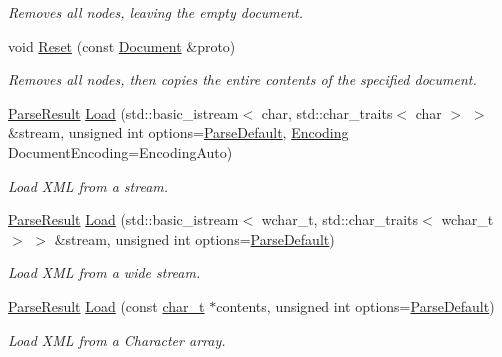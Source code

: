 \begin{DoxyCompactItemize}
\begin{DoxyCompactList}\small\item\em Removes all nodes, leaving the empty document. \item\end{DoxyCompactList}\item 
void \hyperlink{classphys_1_1xml_1_1Document_aba87e21330118fb43b2aab2c36486b03}{Reset} (const \hyperlink{classphys_1_1xml_1_1Document}{Document} \&proto)
\begin{DoxyCompactList}\small\item\em Removes all nodes, then copies the entire contents of the specified document. \item\end{DoxyCompactList}\item 
\hyperlink{structphys_1_1xml_1_1ParseResult}{ParseResult} \hyperlink{classphys_1_1xml_1_1Document_a9d4ddfd3b987fa3d31d41c06d06a001e}{Load} (std::basic\_\-istream$<$ char, std::char\_\-traits$<$ char $>$ $>$ \&stream, unsigned int options=\hyperlink{namespacephys_1_1xml_aa6b8f7f8c2322fd683a235b498834d60}{ParseDefault}, \hyperlink{namespacephys_1_1xml_a420f5de782438f88160321385bea2015}{Encoding} DocumentEncoding=EncodingAuto)
\begin{DoxyCompactList}\small\item\em Load XML from a stream. \item\end{DoxyCompactList}\item 
\hyperlink{structphys_1_1xml_1_1ParseResult}{ParseResult} \hyperlink{classphys_1_1xml_1_1Document_a5c31cda427eeeb61cd40932f7bec6376}{Load} (std::basic\_\-istream$<$ wchar\_\-t, std::char\_\-traits$<$ wchar\_\-t $>$ $>$ \&stream, unsigned int options=\hyperlink{namespacephys_1_1xml_aa6b8f7f8c2322fd683a235b498834d60}{ParseDefault})
\begin{DoxyCompactList}\small\item\em Load XML from a wide stream. \item\end{DoxyCompactList}\item 
\hyperlink{structphys_1_1xml_1_1ParseResult}{ParseResult} \hyperlink{classphys_1_1xml_1_1Document_a7ae98719610eefc5c05255e305c75e56}{Load} (const \hyperlink{namespacephys_1_1xml_afc87705cd1c2917d87b879715a2d8f6e}{char\_\-t} $\ast$contents, unsigned int options=\hyperlink{namespacephys_1_1xml_aa6b8f7f8c2322fd683a235b498834d60}{ParseDefault})
\begin{DoxyCompactList}\small\item\em Load XML from a Character array. \item\end{DoxyCompactList}\item 

\end{DoxyCompactItemize}
